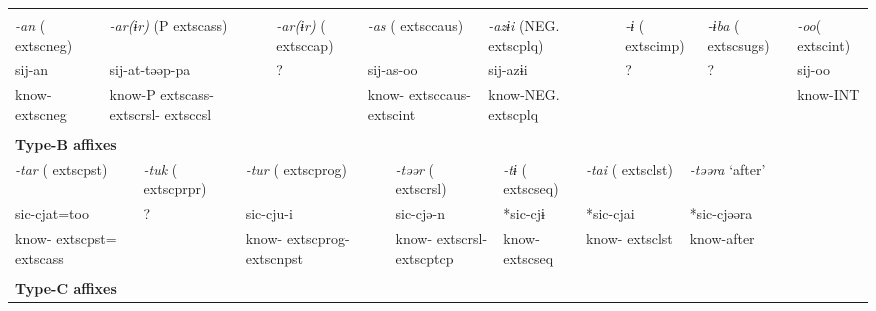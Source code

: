 \tabletail{}
\tablelasttail{}
\begin{tabularx}{\textwidth}{XXXXXXXXXXXXXXXXXXXXXX}
\lsptoprule
\multicolumn{22}{X}{{\bfseries Type-A affixes}}\\
{ \textit{{}-an} (	extsc{neg})} & \multicolumn{7}{X}{{ \textit{{}-ar(ɨr)} (P	extsc{ass})}} & \multicolumn{2}{X}{{ \textit{{}-ar(ɨr)} (	extsc{cap})}} & \multicolumn{4}{X}{{ \textit{{}-as} (	extsc{caus})}} & \multicolumn{4}{X}{{ \textit{{}-azɨi} (NEG.	extsc{plq})}} & \multicolumn{2}{X}{{ \textit{{}-ɨ} (	extsc{imp})}} & { \textit{{}-ɨba} (	extsc{sugs})} & { \textit{{}-oo}(	extsc{int})}\\
{ sij-an} & \multicolumn{7}{X}{{ sij-at-təəp-pa}} & \multicolumn{2}{X}{{ ?}} & \multicolumn{4}{X}{{ sij-as-oo}} & \multicolumn{4}{X}{{ sij-azɨi}} & \multicolumn{2}{X}{{ ?}} & { ?} & { sij-oo}\\
know-	extsc{neg} & \multicolumn{7}{X}{know-P	extsc{ass}-	extsc{rsl}-	extsc{csl}} & \multicolumn{2}{X}{} & \multicolumn{4}{X}{know-	extsc{caus}-	extsc{int}} & \multicolumn{4}{X}{know-NEG.	extsc{plq}} & \multicolumn{2}{X}{} &  & know-INT\\
\multicolumn{22}{X}{}\\
\multicolumn{22}{X}{{\bfseries Type-B affixes}}\\
\multicolumn{3}{X}{{ \textit{{}-tar} (	extsc{pst})}} & \multicolumn{3}{X}{{ \textit{{}-tuk} (	extsc{prpr})}} & \multicolumn{5}{X}{{ \textit{{}-tur} (	extsc{prog})}} & \multicolumn{4}{X}{{ \textit{{}-təər} (	extsc{rsl})}} & \multicolumn{2}{X}{{ \textit{{}-tɨ} (	extsc{seq})}} & \multicolumn{2}{X}{{ \textit{{}-tai} (	extsc{lst})}} & \multicolumn{3}{X}{{ \textit{{}-təəra} ‘after’}}\\
\multicolumn{3}{X}{{ sic-cjat=too}} & \multicolumn{3}{X}{{ ?}} & \multicolumn{5}{X}{{ sic-cju-i}} & \multicolumn{4}{X}{{ sic-cjə-n}} & \multicolumn{2}{X}{{ *sic-cjɨ}} & \multicolumn{2}{X}{{ *sic-cjai}} & \multicolumn{3}{X}{{ *sic-cjəəra}}\\
\multicolumn{3}{X}{know-	extsc{pst}=	extsc{ass}} & \multicolumn{3}{X}{} & \multicolumn{5}{X}{know-	extsc{prog}-	extsc{npst}} & \multicolumn{4}{X}{know-	extsc{rsl}-	extsc{ptcp}} & \multicolumn{2}{X}{know-	extsc{seq}} & \multicolumn{2}{X}{know-	extsc{lst}} & \multicolumn{3}{X}{{ know-after}}\\
\multicolumn{3}{X}{} & \multicolumn{3}{X}{} & \multicolumn{5}{X}{} & \multicolumn{4}{X}{} & \multicolumn{2}{X}{} & \multicolumn{2}{X}{} & \multicolumn{3}{X}{}\\
\multicolumn{22}{X}{{\bfseries Type-C affixes}}\\

\end{tabularx}
